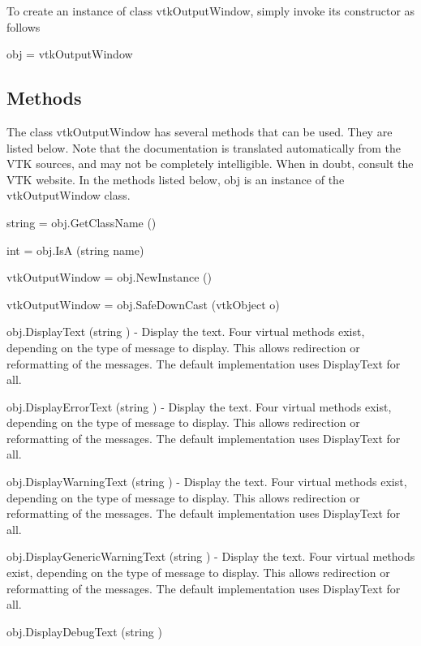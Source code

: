 To create an instance of class vtk\-Output\-Window, simply invoke its constructor as follows \begin{DoxyVerb}  obj = vtkOutputWindow
\end{DoxyVerb}
 \hypertarget{vtkwidgets_vtkxyplotwidget_Methods}{}\subsection{Methods}\label{vtkwidgets_vtkxyplotwidget_Methods}
The class vtk\-Output\-Window has several methods that can be used. They are listed below. Note that the documentation is translated automatically from the V\-T\-K sources, and may not be completely intelligible. When in doubt, consult the V\-T\-K website. In the methods listed below, {\ttfamily obj} is an instance of the vtk\-Output\-Window class. 
\begin{DoxyItemize}
\item {\ttfamily string = obj.\-Get\-Class\-Name ()}  
\item {\ttfamily int = obj.\-Is\-A (string name)}  
\item {\ttfamily vtk\-Output\-Window = obj.\-New\-Instance ()}  
\item {\ttfamily vtk\-Output\-Window = obj.\-Safe\-Down\-Cast (vtk\-Object o)}  
\item {\ttfamily obj.\-Display\-Text (string )} -\/ Display the text. Four virtual methods exist, depending on the type of message to display. This allows redirection or reformatting of the messages. The default implementation uses Display\-Text for all.  
\item {\ttfamily obj.\-Display\-Error\-Text (string )} -\/ Display the text. Four virtual methods exist, depending on the type of message to display. This allows redirection or reformatting of the messages. The default implementation uses Display\-Text for all.  
\item {\ttfamily obj.\-Display\-Warning\-Text (string )} -\/ Display the text. Four virtual methods exist, depending on the type of message to display. This allows redirection or reformatting of the messages. The default implementation uses Display\-Text for all.  
\item {\ttfamily obj.\-Display\-Generic\-Warning\-Text (string )} -\/ Display the text. Four virtual methods exist, depending on the type of message to display. This allows redirection or reformatting of the messages. The default implementation uses Display\-Text for all.  
\item {\ttfamily obj.\-Display\-Debug\-Text (string )}  

\end{DoxyItemize}
